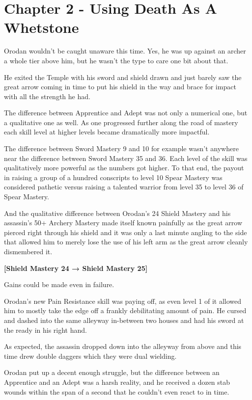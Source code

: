 \documentclass[a4paper,10pt]{book}
\begin{document}
\section*{Chapter 2 - Using Death As A Whetstone}
%
\par
Orodan wouldn’t be caught unaware this time. Yes, he was up against an archer a whole tier above him, but he wasn’t the type to care one bit about that.\par
He exited the Temple with his sword and shield drawn and just barely saw the great arrow coming in time to put his shield in the way and brace for impact with all the strength he had.\par
The difference between Apprentice and Adept was not only a numerical one, but a qualitative one as well. As one progressed further along the road of mastery each skill level at higher levels became dramatically more impactful.\par
The difference between Sword Mastery 9 and 10 for example wasn’t anywhere near the difference between Sword Mastery 35 and 36. Each level of the skill was qualitatively more powerful as the numbers got higher. To that end, the payout in raising a group of a hundred conscripts to level 10 Spear Mastery was considered pathetic versus raising a talented warrior from level 35 to level 36 of Spear Mastery.\par
And the qualitative difference between Orodan’s 24 Shield Mastery and his assassin’s 50+ Archery Mastery made itself known painfully as the great arrow pierced right through his shield and it was only a last minute angling to the side that allowed him to merely lose the use of his left arm as the great arrow cleanly dismembered it.\par
\textbf{[Shield Mastery 24 → Shield Mastery 25]}\par
Gains could be made even in failure.\par
Orodan’s new Pain Resistance skill was paying off, as even level 1 of it allowed him to mostly take the edge off a frankly debilitating amount of pain. He cursed and dashed into the same alleyway in-between two houses and had his sword at the ready in his right hand.\par
As expected, the assassin dropped down into the alleyway from above and this time drew double daggers which they were dual wielding.\par
Orodan put up a decent enough struggle, but the difference between an Apprentice and an Adept was a harsh reality, and he received a dozen stab wounds within the span of a second that he couldn’t even react to in time.\par
\end{document}
